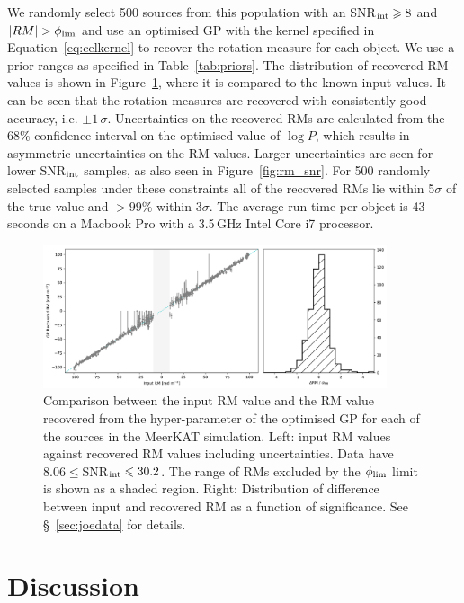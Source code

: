 \documentclass[fleqn,usenatbib]{mnras}
\begin{document}
We randomly select 500 sources from this population with an SNR$_{\rm int}\ge8$ and $|RM|>\phi_{\rm lim}$ and use an optimised GP with the kernel specified in Equation~\ref{eq:celkernel} to recover the rotation measure for each object. We use a prior ranges as specified in Table~\ref{tab:priors}.  The distribution of recovered RM values is shown in Figure~\ref{fig:survey}, where it is compared to the known input values. It can be seen that the rotation measures are recovered with consistently good accuracy, i.e. $\pm 1\,\sigma$. Uncertainties on the recovered RMs are calculated from the 68\% confidence interval on the optimised value of $\log P$, which results in asymmetric uncertainties on the RM values. Larger uncertainties are seen for lower SNR$_{\rm int}$ samples, as also seen in Figure~\ref{fig:rm_snr}. For 500 randomly selected samples under these constraints all of the recovered RMs lie within 5$\sigma$ of the true value and $>99\%$ within 3$\sigma$. The average run time per object is 43\,seconds on a Macbook Pro with a 3.5\,GHz Intel Core i7 processor.
%
\begin{figure}
\includegraphics[width=0.9\textwidth]{./FIGURES/rm_comp.png}
\caption{\label{fig:survey} Comparison between the input RM value and the RM value recovered from the hyper-parameter of the optimised GP for each of the sources in the MeerKAT simulation. Left: input RM values against recovered RM values including uncertainties. Data have $8.06 \le$SNR$_{\rm int} \le 30.2$. The range of RMs excluded by the $\phi_{\rm lim}$ limit is shown as a shaded region. Right: Distribution of difference between input and recovered RM as a function of significance. See \S~\ref{sec:joedata} for details.}
\end{figure}




\section{Discussion}
\label{sec:disc}
\end{document}
